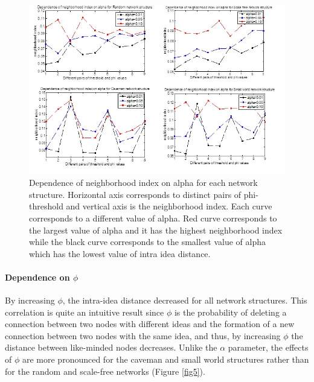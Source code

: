 \begin{figure}
[htp]
\begin{center}
\includegraphics{Fig4}
\end{center}
\caption{Dependence of neighborhood index on alpha for each network structure. Horizontal axis corresponds to distinct pairs of phi-threshold and   vertical axis is the neighborhood index. Each curve corresponds to a different value of alpha. Red curve corresponds to the largest value of alpha and it has the highest neighborhood index while the black curve corresponds to the smallest value of alpha which has the lowest value of intra idea distance.}
\label {fig4}
\end{figure}

\paragraph{Dependence on $\phi$}
By increasing $\phi$, the intra-idea distance decreased for all network structures. This correlation is quite an intuitive result since $\phi$ is the probability of deleting a connection between two nodes with different ideas and the formation of a new connection between two nodes with the same idea, and thus, by increasing $\phi$ the distance between like-minded nodes decreases. Unlike the $\alpha$ parameter, the effects of $\phi$ are more pronounced for the caveman and small world structures rather than for the random and scale-free networks (Figure \ref{fig5}).

